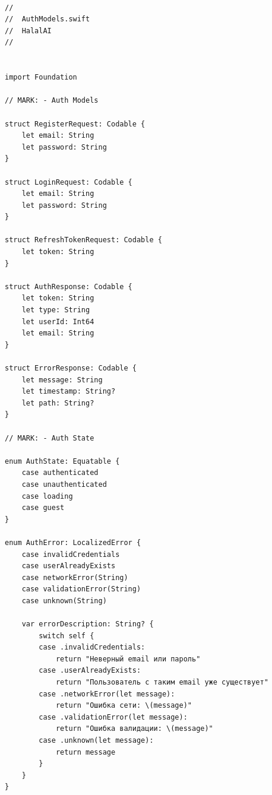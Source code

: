 \begin{lstlisting}[basicstyle=\tiny\ttfamily,breaklines=true]

//
//  AuthModels.swift
//  HalalAI
//


import Foundation

// MARK: - Auth Models

struct RegisterRequest: Codable {
    let email: String
    let password: String
}

struct LoginRequest: Codable {
    let email: String
    let password: String
}

struct RefreshTokenRequest: Codable {
    let token: String
}

struct AuthResponse: Codable {
    let token: String
    let type: String
    let userId: Int64
    let email: String
}

struct ErrorResponse: Codable {
    let message: String
    let timestamp: String?
    let path: String?
}

// MARK: - Auth State

enum AuthState: Equatable {
    case authenticated
    case unauthenticated
    case loading
    case guest
}

enum AuthError: LocalizedError {
    case invalidCredentials
    case userAlreadyExists
    case networkError(String)
    case validationError(String)
    case unknown(String)

    var errorDescription: String? {
        switch self {
        case .invalidCredentials:
            return "Неверный email или пароль"
        case .userAlreadyExists:
            return "Пользователь с таким email уже существует"
        case .networkError(let message):
            return "Ошибка сети: \(message)"
        case .validationError(let message):
            return "Ошибка валидации: \(message)"
        case .unknown(let message):
            return message
        }
    }
}
\end{lstlisting}

